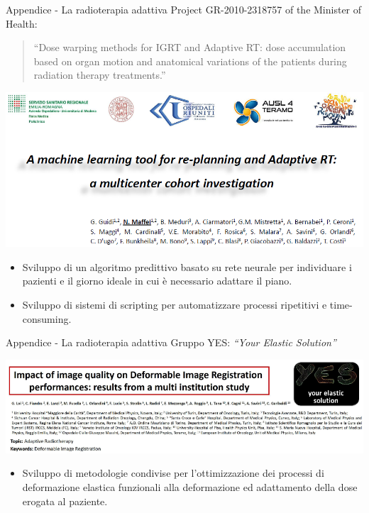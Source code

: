 \documentclass{beamer}
\begin{document}
\begin{frame}{Appendice - La radioterapia adattiva}
\footnotesize
Project GR-2010-2318757 of the Minister of Health:
\begin{quotation}
\scriptsize
``Dose warping methods for IGRT and Adaptive RT: dose accumulation based on organ motion and anatomical variations of the patients during radiation therapy treatments.''
\end{quotation}
\vspace{-.3cm}
\begin{center}
\includegraphics[width=.8\textwidth]{./img/Pub_mod.png}\\ \vspace{.2cm}
\end{center}
\vspace{-.3cm}
\footnotesize
{}
\begin{itemize}
\scriptsize
\item Sviluppo di un algoritmo predittivo basato su rete neurale per individuare i pazienti e il giorno ideale in cui è necessario adattare il piano.
\item Sviluppo di sistemi di scripting per automatizzare processi ripetitivi e time-consuming.
\end{itemize}
\end{frame}


\begin{frame}{Appendice - La radioterapia adattiva}
\footnotesize
Gruppo YES: \textit{``Your Elastic Solution''}

\vspace{-.1cm}
\begin{center}
\includegraphics[width=\textwidth]{./img/Pub_YES.png}\\ \vspace{.2cm}
\end{center}
\vspace{-.1cm}
\footnotesize
{}
\begin{itemize}
\scriptsize
\item Sviluppo di metodologie condivise per l'ottimizzazione dei processi di deformazione elastica funzionali alla deformazione ed adattamento della dose erogata al paziente.
\end{itemize}
\end{frame}
\end{document}
